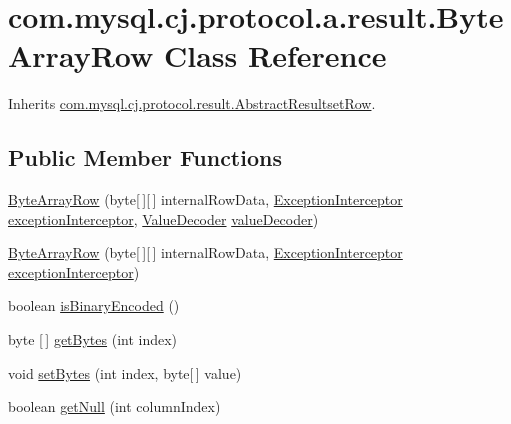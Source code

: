 \hypertarget{classcom_1_1mysql_1_1cj_1_1protocol_1_1a_1_1result_1_1_byte_array_row}{}\section{com.\+mysql.\+cj.\+protocol.\+a.\+result.\+Byte\+Array\+Row Class Reference}
\label{classcom_1_1mysql_1_1cj_1_1protocol_1_1a_1_1result_1_1_byte_array_row}


Inherits \mbox{\hyperlink{classcom_1_1mysql_1_1cj_1_1protocol_1_1result_1_1_abstract_resultset_row}{com.\+mysql.\+cj.\+protocol.\+result.\+Abstract\+Resultset\+Row}}.

\subsection*{Public Member Functions}
\begin{DoxyCompactItemize}
\item 
\mbox{\hyperlink{classcom_1_1mysql_1_1cj_1_1protocol_1_1a_1_1result_1_1_byte_array_row_ab3f796910db8e0489e63abd9a10e4d91}{Byte\+Array\+Row}} (byte\mbox{[}$\,$\mbox{]}\mbox{[}$\,$\mbox{]} internal\+Row\+Data, \mbox{\hyperlink{interfacecom_1_1mysql_1_1cj_1_1exceptions_1_1_exception_interceptor}{Exception\+Interceptor}} \mbox{\hyperlink{classcom_1_1mysql_1_1cj_1_1protocol_1_1result_1_1_abstract_resultset_row_a50c0daccb2e9e7e2445af4a09d6fb9d0}{exception\+Interceptor}}, \mbox{\hyperlink{interfacecom_1_1mysql_1_1cj_1_1protocol_1_1_value_decoder}{Value\+Decoder}} \mbox{\hyperlink{classcom_1_1mysql_1_1cj_1_1protocol_1_1result_1_1_abstract_resultset_row_a62b113b0142a35b7962695b43b5b8e22}{value\+Decoder}})
\item 
\mbox{\hyperlink{classcom_1_1mysql_1_1cj_1_1protocol_1_1a_1_1result_1_1_byte_array_row_a883fd0a08c4efb53ce2fccbfa21f6c90}{Byte\+Array\+Row}} (byte\mbox{[}$\,$\mbox{]}\mbox{[}$\,$\mbox{]} internal\+Row\+Data, \mbox{\hyperlink{interfacecom_1_1mysql_1_1cj_1_1exceptions_1_1_exception_interceptor}{Exception\+Interceptor}} \mbox{\hyperlink{classcom_1_1mysql_1_1cj_1_1protocol_1_1result_1_1_abstract_resultset_row_a50c0daccb2e9e7e2445af4a09d6fb9d0}{exception\+Interceptor}})
\item 
boolean \mbox{\hyperlink{classcom_1_1mysql_1_1cj_1_1protocol_1_1a_1_1result_1_1_byte_array_row_a30e76b0cb27fb8a86ea186066605e756}{is\+Binary\+Encoded}} ()
\item 
byte \mbox{[}$\,$\mbox{]} \mbox{\hyperlink{classcom_1_1mysql_1_1cj_1_1protocol_1_1a_1_1result_1_1_byte_array_row_a51fcdd0efd6909d54dc395077c800768}{get\+Bytes}} (int index)
\item 
void \mbox{\hyperlink{classcom_1_1mysql_1_1cj_1_1protocol_1_1a_1_1result_1_1_byte_array_row_a2606ac2688da3531d2e72bfd51949632}{set\+Bytes}} (int index, byte\mbox{[}$\,$\mbox{]} value)
\item 
boolean \mbox{\hyperlink{classcom_1_1mysql_1_1cj_1_1protocol_1_1a_1_1result_1_1_byte_array_row_a53f7e5fef1221819ac7c48db6dc9ce94}{get\+Null}} (int column\+Index)
\end{DoxyCompactItemize}
